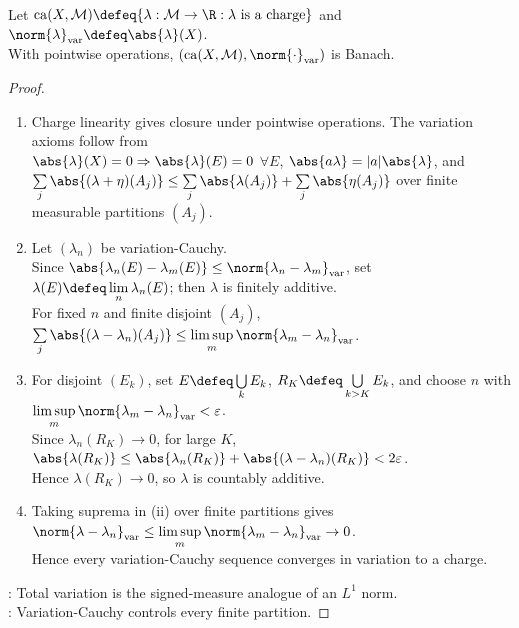 \begin{theorem} \label{thm:charges-total-variation-banach} \\
Let $\operatorname{ca}(X,\mathcal{M})\defeq\{\lambda:\mathcal{M}\to\R:\lambda\text{ is a charge}\}$ and $\norm{\lambda}_{\mathrm{var}}\defeq\abs{\lambda}(X)$.\\
With pointwise operations, $(\operatorname{ca}(X,\mathcal{M}),\norm{\cdot}_{\mathrm{var}})$ is Banach.
\begin{proof}
\begin{enumerate}[label=(\roman*)]
\setlength{\itemsep}{0pt}
\item Charge linearity gives closure under pointwise operations. The variation axioms follow from\\
$\abs{\lambda}(X)=0\Rightarrow\abs{\lambda}(E)=0$ $\forall E$, $\abs{a\lambda}=|a|\abs{\lambda}$, and $\sum\limits_j\abs{(\lambda+\eta)(A_j)}\leq\sum\limits_j\abs{\lambda(A_j)}+\sum\limits_j\abs{\eta(A_j)}$ over finite measurable partitions $(A_j)$.
\item Let $(\lambda_n)$ be variation-Cauchy.\\
Since $\abs{\lambda_n(E)-\lambda_m(E)}\leq\norm{\lambda_n-\lambda_m}_{\mathrm{var}}$, set $\lambda(E)\defeq\lim\limits_n\lambda_n(E)$; then $\lambda$ is finitely additive.\\
For fixed $n$ and finite disjoint $(A_j)$, $\sum\limits_j\abs{(\lambda-\lambda_n)(A_j)}\leq\limsup\limits_m\norm{\lambda_m-\lambda_n}_{\mathrm{var}}$.
\item For disjoint $(E_k)$, set $E\defeq\bigcup\limits_kE_k$, $R_K\defeq\bigcup\limits_{k>K}E_k$, and choose $n$ with $\limsup\limits_m\norm{\lambda_m-\lambda_n}_{\mathrm{var}}<\varepsilon$.\\
Since $\lambda_n(R_K)\to0$, for large $K$, $\abs{\lambda(R_K)}\leq\abs{\lambda_n(R_K)}+\abs{(\lambda-\lambda_n)(R_K)}<2\varepsilon$.\\
Hence $\lambda(R_K)\to0$, so $\lambda$ is countably additive.
\item Taking suprema in (ii) over finite partitions gives $\norm{\lambda-\lambda_n}_{\mathrm{var}}\leq\limsup\limits_m\norm{\lambda_m-\lambda_n}_{\mathrm{var}}\to0$.\\
Hence every variation-Cauchy sequence converges in variation to a charge.
\end{enumerate}
: Total variation is the signed-measure analogue of an $L^1$ norm.\\
: Variation-Cauchy controls every finite partition.
\end{proof}
\end{theorem}

